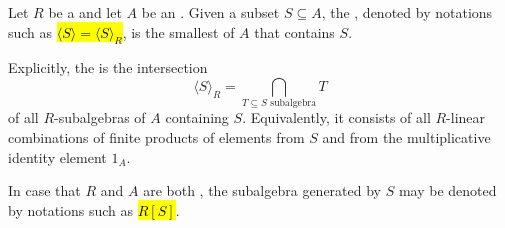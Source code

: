 \begin{definition} \label{definition:subalgebra_of_an_algebra_over_a_not_necessarily_commutative_ring_generated_by_a_subset}
    Let $R$ be a  and let $A$ be an . Given a subset $S \subseteq A$, the , denoted by notations such as \hl{$\langle S \rangle = \langle S \rangle_R$}, is the smallest  of $A$ that contains $S$.

    Explicitly, the  is the intersection 
    $$\langle S \rangle_R = \bigcap_{T \subseteq S \text{ subalgebra}} T$$
    of all $R$-subalgebras of $A$ containing $S$. Equivalently, it consists of all $R$-linear combinations of finite products of elements from $S$ and from the multiplicative identity element $1_A$.

    In case that $R$ and $A$ are both , the subalgebra generated by $S$ may be denoted by notations such as \hl{$R[S]$}.
\end{definition}